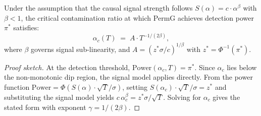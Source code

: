 \begin{proposition}
\label{prop:phase-boundary}
Under the assumption that the causal signal strength follows
$S(\alpha) = c \cdot \alpha^\beta$ with $\beta < 1$,
the critical contamination ratio at which PermG achieves detection power $\pi^*$ satisfies:
\begin{equation}
\alpha_c(T) \;=\; A \cdot T^{-1/(2\beta)},
\end{equation}
where $\beta$ governs signal sub-linearity, and $A = (z^* \sigma / c)^{1/\beta}$ with
$z^* = \Phi^{-1}(\pi^*)$.
\end{proposition}

\begin{proof}[Proof sketch]
At the detection threshold, $\text{Power}(\alpha_c, T) = \pi^*$. Since $\alpha_c$ lies
below the non-monotonic dip region, the signal model applies directly. From the power
function $\text{Power} = \Phi(S(\alpha) \cdot \sqrt{T} / \sigma)$, setting
$S(\alpha_c) \cdot \sqrt{T} / \sigma = z^*$ and substituting the signal model yields
$c\, \alpha_c^\beta = z^* \sigma / \sqrt{T}$. Solving for $\alpha_c$
gives the stated form with exponent $\gamma = 1/(2\beta)$.
\end{proof}


